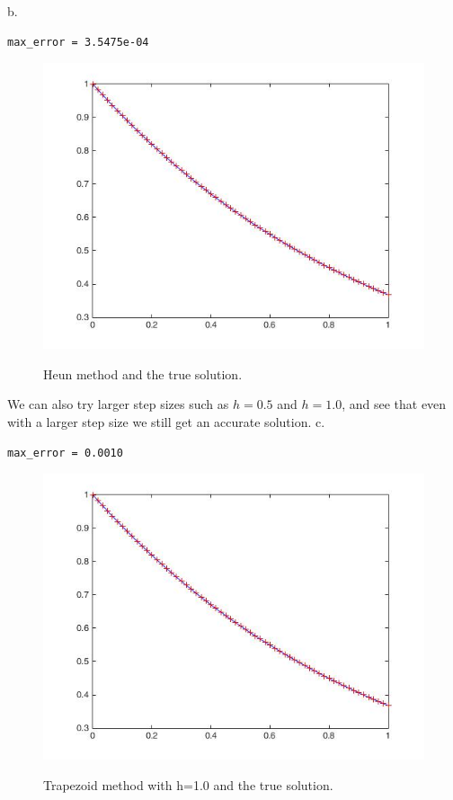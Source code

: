 \documentclass[12pt letterpaper]{article}
\begin{document}
\noindent b. 
\begin{verbatim}
max_error = 3.5475e-04
\end{verbatim}
\begin{figure}[H]
  \caption{Heun method and the true solution.}
  \centering
    \includegraphics[width=.5\textwidth]{heuns_stiff_smaller.jpg}
    \label{fig:heun_4b}
\end{figure}

\noindent We can also try larger step sizes such as $h = 0.5$ and $h = 1.0$, and see that even with a larger step size we still get an accurate solution. 
\noindent c. 

\begin{verbatim}
max_error = 0.0010
\end{verbatim}
\begin{figure}[H]
  \caption{Trapezoid method with h=1.0 and the true solution.}
  \centering
    \includegraphics[width=.5\textwidth]{heuns_stiff_smaller.jpg}
    \label{fig:trapezoid_4}
\end{figure}
\end{document}
